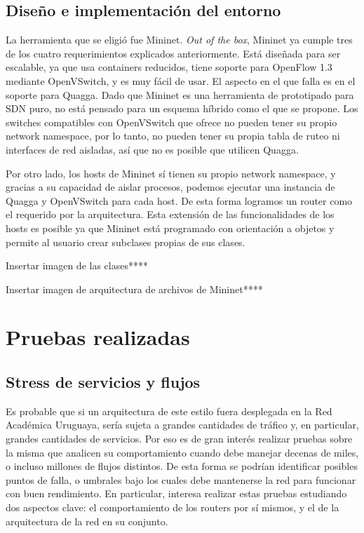 \documentclass[a4paper,12pt]{report}
\begin{document}
\subsection{Diseño e implementación del entorno}
La herramienta que se eligió fue Mininet. \textit{Out of the box}, Mininet ya cumple tres de los cuatro requerimientos explicados anteriormente. Está diseñada para ser escalable, ya que usa containers reducidos, tiene soporte para OpenFlow 1.3 mediante OpenVSwitch, y es muy fácil de usar. El aspecto en el que falla es en el soporte para Quagga. Dado que Mininet es una herramienta de prototipado para SDN puro, no está pensado para un esquema híbrido como el que se propone. Los switches compatibles con OpenVSwitch que ofrece no pueden tener su propio network namespace, por lo tanto, no pueden tener su propia tabla de ruteo ni interfaces de red aisladas, así que no es posible que utilicen Quagga.

Por otro lado, los hosts de Mininet sí tienen su propio network namespace, y gracias a su capacidad de aislar procesos, podemos ejecutar una instancia de Quagga y OpenVSwitch para cada host. De esta forma logramos un router como el requerido por la arquitectura. Esta extensión de las funcionalidades de los hosts es posible ya que Mininet está programado con orientación a objetos y permite al usuario crear subclases propias de sus clases.

Insertar imagen de las clases****

Insertar imagen de arquitectura de archivos de Mininet****



\section{Pruebas realizadas}

\subsection{Stress de servicios y flujos}
Es probable que si un arquitectura de este estilo fuera desplegada en la Red Académica Uruguaya, sería sujeta a grandes cantidades de tráfico y, en particular, grandes cantidades de servicios. Por eso es de gran interés realizar pruebas sobre la misma que analicen su comportamiento cuando debe manejar decenas de miles, o incluso millones de flujos distintos. De esta forma se podrían identificar posibles puntos de falla, o umbrales bajo los cuales debe mantenerse la red para funcionar con buen rendimiento.
En particular, interesa realizar estas pruebas estudiando dos aspectos clave: el comportamiento de los routers por sí mismos, y el de la arquitectura de la red en su conjunto.
\end{document}
